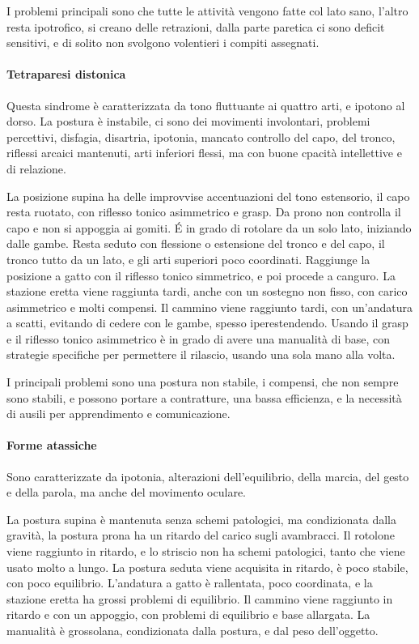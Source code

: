 I problemi principali sono che tutte le attività vengono fatte col lato sano, l'altro resta ipotrofico, si creano delle retrazioni,
dalla parte paretica ci sono deficit sensitivi, e di solito non svolgono volentieri i compiti assegnati.

\paragraph{Tetraparesi distonica}
Questa sindrome è caratterizzata da tono fluttuante ai quattro arti, e ipotono al dorso. La postura è instabile, ci sono dei movimenti
involontari, problemi percettivi, disfagia, disartria, ipotonia, mancato controllo del capo, del tronco, riflessi arcaici mantenuti,
arti inferiori flessi, ma con buone cpacità intellettive e di relazione.

La posizione supina ha delle improvvise accentuazioni del tono estensorio, il capo resta ruotato, con riflesso tonico asimmetrico e
grasp.
Da prono non controlla il capo e non si appoggia ai gomiti.
\'E in grado di rotolare da un solo lato, iniziando dalle gambe.
Resta seduto con flessione o estensione del tronco e del capo, il tronco tutto da un lato, e gli arti superiori poco coordinati.
Raggiunge la posizione a gatto con il riflesso tonico simmetrico, e poi procede a canguro.
La stazione eretta viene raggiunta tardi, anche con un sostegno non fisso, con carico asimmetrico e molti compensi.
Il cammino viene raggiunto tardi, con un'andatura a scatti, evitando di cedere con le gambe, spesso iperestendendo.
Usando il grasp e il riflesso tonico asimmetrico è in grado di avere una manualità di base, con strategie specifiche per permettere il
rilascio, usando una sola mano alla volta.

I principali problemi sono una postura non stabile, i compensi, che non sempre sono stabili, e possono portare a contratture, una bassa
efficienza, e la necessità di ausili per apprendimento e comunicazione.

\paragraph{Forme atassiche}
Sono caratterizzate da ipotonia, alterazioni dell'equilibrio, della marcia, del gesto e della parola, ma anche del movimento oculare.

La postura supina è mantenuta senza schemi patologici, ma condizionata dalla gravità, la postura prona ha un ritardo del carico sugli
avambracci.
Il rotolone viene raggiunto in ritardo, e lo striscio non ha schemi patologici, tanto che viene usato molto a lungo.
La postura seduta viene acquisita in ritardo, è poco stabile, con poco equilibrio.
L'andatura a gatto è rallentata, poco coordinata, e la stazione eretta ha grossi problemi di equilibrio.
Il cammino viene raggiunto in ritardo e con un appoggio, con problemi di equilibrio e base allargata.
La manualità è grossolana, condizionata dalla postura, e dal peso dell'oggetto.

